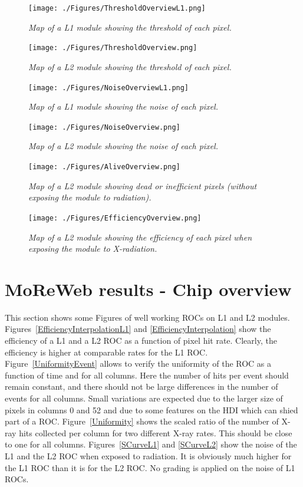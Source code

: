 \documentclass[a4paper,12pt,twoside]{article}
\begin{document}
\begin{appendices}
\begin{figure} [h!] \centering 
\texttt{[image: ./Figures/ThresholdOverviewL1.png]}
\caption{\em  \label{ThresholdOverviewL1} 
Map of a L1 module showing the threshold of each pixel.}
\end{figure}

\begin{figure} [h!] \centering 
\texttt{[image: ./Figures/ThresholdOverview.png]}
\caption{\em  \label{ThresholdOverview} 
Map of a L2 module showing the threshold of each pixel.}
\end{figure}

\begin{figure} [h!] \centering 
\texttt{[image: ./Figures/NoiseOverviewL1.png]}
\caption{\em  \label{NoiseOverviewL1} 
Map of a L1 module showing the noise of each pixel.}
\end{figure}

\begin{figure} [h!] \centering 
\texttt{[image: ./Figures/NoiseOverview.png]}
\caption{\em  \label{NoiseOverview} 
Map of a L2 module showing the noise of each pixel.}
\end{figure}

\begin{figure} [h!] \centering 
\texttt{[image: ./Figures/AliveOverview.png]}
\caption{\em  \label{AliveOverview} 
Map of a L2 module showing dead or inefficient pixels (without exposing the module to radiation).}
\end{figure}

\begin{figure} [h!] \centering 
\texttt{[image: ./Figures/EfficiencyOverview.png]}
\caption{\em  \label{EfficiencyOverview} 
Map of a L2 module showing the efficiency of each pixel when exposing the module to X-radiation.}
\end{figure}


\section{MoReWeb results - Chip overview} \label{ChipOverview}

This section shows some Figures of well working ROCs on L1 and L2 modules. Figures~\ref{EfficiencyInterpolationL1} and \ref{EfficiencyInterpolation} show the efficiency of a L1 and a L2 ROC as a function of pixel hit rate. Clearly, the efficiency is higher at comparable rates for the L1 ROC. Figure~\ref{UniformityEvent} allows to verify the uniformity of the ROC as a function of time and for all columns. Here the number of hits per event should remain constant, and there should not be large differences in the number of events for all columns. Small variations are expected due to the larger size of pixels in columns 0 and 52 and due to some features on the HDI which can shied part of a ROC. Figure~\ref{Uniformity} shows the scaled ratio of the number of X-ray hits collected per column for two different X-ray rates. This should be close to one for all columns. Figures~\ref{SCurveL1} and \ref{SCurveL2} show the noise of the L1 and the L2 ROC when exposed to radiation. It is obviously much higher for the L1 ROC than it is for the L2 ROC. No grading is applied on the noise of L1 ROCs. 


\end{appendices}
\end{document}
